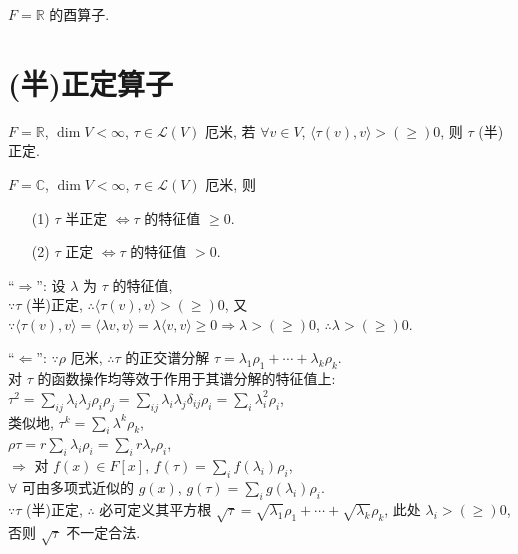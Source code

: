 \documentclass{note}
\begin{document}
\begin{df}[正交算子]
    $F=\mathbb{R}$ 的酉算子.
\end{df}

\section{(半)正定算子}
\begin{df}[(半)正定算子]
    $F=\mathbb{R}$, $\dim V<\infty$, $\tau\in\mathcal{L}(V)$ 厄米, 若 $\forall v\in V$, $\langle\tau(v),v\rangle>(\geq)0$, 则 $\tau$ (半)正定.
\end{df}

\begin{thm}
    $F=\mathbb{C}$, $\dim V<\infty$, $\tau\in\mathcal{L}(V)$ 厄米, 则
    \begin{itemize}
        \item[(1)] $\tau$ 半正定 $\Longleftrightarrow\tau$ 的特征值 $\geq 0$.
        \item[(2)] $\tau$ 正定 $\Longleftrightarrow\tau$ 的特征值 $>0$.
    \end{itemize}
\end{thm}
\begin{pf}
        ``$\Longrightarrow$'': 设 $\lambda$ 为 $\tau$ 的特征值,\\
        $\because\tau$ (半)正定, $\therefore\langle\tau(v),v\rangle>(\geq)0$,
        又 $\because\langle\tau(v),v\rangle=\langle\lambda v,v\rangle=\lambda\langle v,v\rangle\geq 0\Longrightarrow\lambda>(\geq)0$, $\therefore\lambda>(\geq)0$.

        ``$\Longleftarrow$'': $\because\rho$ 厄米, $\therefore\tau$ 的正交谱分解 $\tau=\lambda_1\rho_1+\cdots+\lambda_k\rho_k$.\\
        对 $\tau$ 的函数操作均等效于作用于其谱分解的特征值上: $\tau^2=\sum_{ij}\lambda_i\lambda_j\rho_i\rho_j=\sum_{ij}\lambda_i\lambda_j\delta_{ij}\rho_i=\sum_i\lambda_i^2\rho_i$,\\
        类似地, $\tau^k=\sum_{i}\lambda^k\rho_k$,\\
        $\rho\tau=r\sum_i\lambda_i\rho_i=\sum_ir\lambda_r\rho_i$,\\
        $\Longrightarrow$ 对 $f(x)\in F[x]$, $f(\tau)=\sum_if(\lambda_i)\rho_i$,\\
        $\forall$ 可由多项式近似的 $g(x)$, $g(\tau)=\sum_ig(\lambda_i)\rho_i$.\\
        $\because\tau$ (半)正定, $\therefore$ 必可定义其平方根 $\sqrt{\tau}=\sqrt{\lambda_1}\rho_1+\cdots+\sqrt{\lambda_k}\rho_k$, 此处 $\lambda_i>(\geq)0$, 否则 $\sqrt{\tau}$ 不一定合法.
\end{pf}
\end{document}
